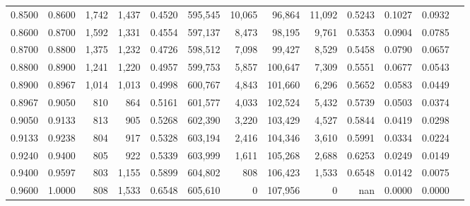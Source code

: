 \begin{tabular}{rrrrrrrrrrrrr}
0.8500 & 0.8600 &  1,742 & 1,437 &                                     0.4520 & 595,545 &  10,065 &  96,864 &  11,092 & 0.5243 & 0.1027 & 0.0932 \\
0.8600 & 0.8700 &  1,592 & 1,331 &                                     0.4554 & 597,137 &   8,473 &  98,195 &   9,761 & 0.5353 & 0.0904 & 0.0785 \\
0.8700 & 0.8800 &  1,375 & 1,232 &                                     0.4726 & 598,512 &   7,098 &  99,427 &   8,529 & 0.5458 & 0.0790 & 0.0657 \\
0.8800 & 0.8900 &  1,241 & 1,220 &                                     0.4957 & 599,753 &   5,857 & 100,647 &   7,309 & 0.5551 & 0.0677 & 0.0543 \\
0.8900 & 0.8967 &  1,014 & 1,013 &                                     0.4998 & 600,767 &   4,843 & 101,660 &   6,296 & 0.5652 & 0.0583 & 0.0449 \\
0.8967 & 0.9050 &    810 &   864 &                                     0.5161 & 601,577 &   4,033 & 102,524 &   5,432 & 0.5739 & 0.0503 & 0.0374 \\
0.9050 & 0.9133 &    813 &   905 &                                     0.5268 & 602,390 &   3,220 & 103,429 &   4,527 & 0.5844 & 0.0419 & 0.0298 \\
0.9133 & 0.9238 &    804 &   917 &                                     0.5328 & 603,194 &   2,416 & 104,346 &   3,610 & 0.5991 & 0.0334 & 0.0224 \\
0.9240 & 0.9400 &    805 &   922 &                                     0.5339 & 603,999 &   1,611 & 105,268 &   2,688 & 0.6253 & 0.0249 & 0.0149 \\
0.9400 & 0.9597 &    803 & 1,155 &                                     0.5899 & 604,802 &     808 & 106,423 &   1,533 & 0.6548 & 0.0142 & 0.0075 \\
0.9600 & 1.0000 &    808 & 1,533 &                                     0.6548 & 605,610 &       0 & 107,956 &       0 &    nan & 0.0000 & 0.0000 \\
\bottomrule
\end{tabular}
